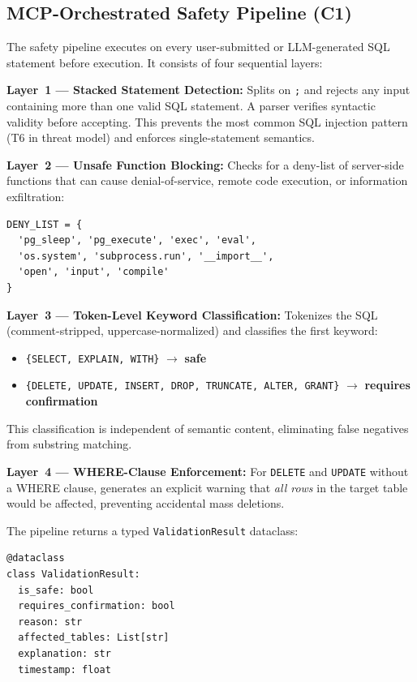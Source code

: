 \documentclass[conference]{IEEEtran}
\begin{document}
\subsection{MCP-Orchestrated Safety Pipeline (C1)}
The safety pipeline executes on every user-submitted or LLM-generated SQL statement before execution. It consists of four sequential layers:

\textbf{Layer~1 --- Stacked Statement Detection:} Splits on \texttt{;} and rejects any input containing more than one valid SQL statement. A parser verifies syntactic validity before accepting. This prevents the most common SQL injection pattern (T6 in threat model) and enforces single-statement semantics.

\textbf{Layer~2 --- Unsafe Function Blocking:} Checks for a deny-list of server-side functions that can cause denial-of-service, remote code execution, or information exfiltration:
\begin{lstlisting}
DENY_LIST = {
  'pg_sleep', 'pg_execute', 'exec', 'eval',
  'os.system', 'subprocess.run', '__import__',
  'open', 'input', 'compile'
}
\end{lstlisting}

\textbf{Layer~3 --- Token-Level Keyword Classification:} Tokenizes the SQL (comment-stripped, uppercase-normalized) and classifies the first keyword:
\begin{itemize}
  \item \texttt{\{SELECT, EXPLAIN, WITH\}} $\rightarrow$ \textbf{safe}
  \item \texttt{\{DELETE, UPDATE, INSERT, DROP, TRUNCATE, ALTER, GRANT\}} $\rightarrow$ \textbf{requires confirmation}
\end{itemize}
This classification is independent of semantic content, eliminating false negatives from substring matching.

\textbf{Layer~4 --- WHERE-Clause Enforcement:} For \texttt{DELETE} and \texttt{UPDATE} without a WHERE clause, generates an explicit warning that \emph{all rows} in the target table would be affected, preventing accidental mass deletions.

The pipeline returns a typed \texttt{ValidationResult} dataclass:
\begin{lstlisting}
@dataclass
class ValidationResult:
  is_safe: bool
  requires_confirmation: bool
  reason: str
  affected_tables: List[str]
  explanation: str
  timestamp: float
\end{lstlisting}
\end{document}

